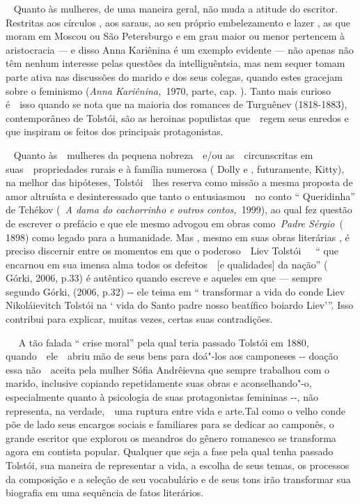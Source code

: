 ~ Quanto às mulheres, de uma maneira geral, não muda a atitude do
escritor. Restritas aos círculos , aos saraus, ao seu próprio
embelezamento e lazer , as que moram em Moscou ou São Petersburgo e em
grau maior ou menor pertencem à aristocracia --- e disso Anna Kariênina é
um exemplo evidente --- não apenas não têm nenhum interesse pelas
questões da intelliguêntsia, mas nem sequer tomam parte ativa nas
discussões do marido e dos seus colegas, quando estes gracejam sobre o
feminismo (\emph{Anna Kariênina,~}1970,  parte, cap. ). Tanto mais
curioso é~~isso quando se nota que na maioria dos romances de Turguênev
(1818-1883), contemporâneo de Tolstói, são as heroinas populistas
que~~regem seus enredos e que inspiram os feitos dos principais
protagonistas.

~ Quanto às~~mulheres da pequena nobreza~~e/ou as~~circunscritas em
suas~~propriedades rurais e à família numerosa ( Dolly e , futuramente,
Kitty), na melhor das hipóteses, Tolstói~~lhes reserva como missão a
mesma proposta de amor altruísta e desinteressado que tanto o
entusiasmou~~no conto `` Queridinha'' de  Tchékov (~\emph{A dama do
cachorrinho e outros contos,~}1999), ao qual fez questão de escrever o
prefácio e que ele mesmo advogou em obras como~\emph{Padre Sérgio}~(
1898) como legado para a humanidade. Mas , mesmo em suas obras
literárias , é preciso discernir entre os momentos em que o
poderoso~~Liev Tolstói~~~`` que encarnou em sua imensa alma todos os
defeitos~~{[}e qualidades{]} da nação'' ( Górki, 2006, p.33) é autêntico
quando escreve e aqueles em que --- sempre segundo Górki, (2006, p.32)
-\/- ele teima em `` transformar a vida do conde Liev Nikoláievitch
Tolstói na ` vida do Santo padre nosso beatífico boiardo Liev'''. Isso
contribui para explicar, muitas vezes, certas suas contradições.

~~ A tão falada `` crise moral'' pela qual teria passado Tolstói em
1880, quando~~ele~~abriu mão de seus bens para doá"-los aos camponeses
-\/- doação essa não~~aceita pela mulher Sófia Andrêievna que sempre
trabalhou com o marido, inclusive copiando repetidamente suas obras e
aconselhando"-o, especialmente quanto à psicologia de suas protagonistas
femininas -\/-, não representa, na verdade,~~uma ruptura entre vida e
arte.Tal como o velho conde põe de lado seus encargos sociais e
familiares para se dedicar ao camponês, o grande escritor que explorou
os meandros do gênero romanesco se transforma agora em contista popular.
Qualquer que seja a fase pela qual tenha passado Tolstói, sua maneira de
representar a vida, a escolha de seus temas, os processos da composição
e a seleção de seu vocabulário e de seus tons irão transformar sua
biografia em uma sequência de fatos literários.

